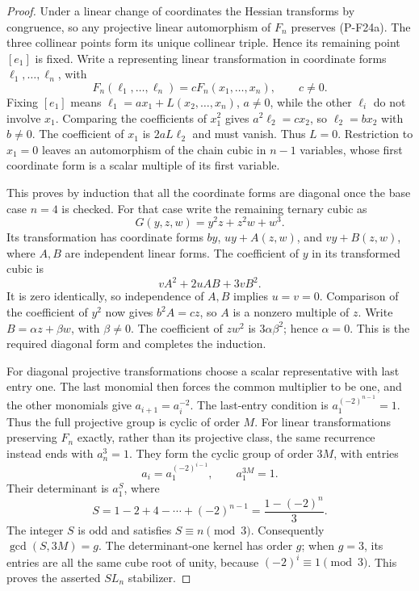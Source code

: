\documentclass[11pt,a4paper]{article}
\begin{document}
\begin{proof}
Under a linear change of coordinates the Hessian transforms by
congruence, so any projective linear automorphism of $F_n$
preserves (P-F24a). The three collinear points form its unique
collinear triple. Hence its remaining point $[e_1]$ is fixed.
Write a representing linear transformation in coordinate forms
$\ell_1,\ldots,\ell_n$, with
\[
 F_n(\ell_1,\ldots,\ell_n)=cF_n(x_1,\ldots,x_n),\qquad c\ne0.
\]
Fixing $[e_1]$ means $\ell_1=ax_1+L(x_2,\ldots,x_n)$,
$a\ne0$, while the other $\ell_i$ do not involve $x_1$.
Comparing the coefficients of $x_1^2$ gives
$a^2\ell_2=cx_2$, so $\ell_2=bx_2$ with $b\ne0$.
The coefficient of $x_1$ is $2aL\ell_2$ and must vanish.
Thus $L=0$. Restriction to $x_1=0$ leaves an automorphism
of the chain cubic in $n-1$ variables, whose first coordinate
form is a scalar multiple of its first variable.

This proves by induction that all the coordinate forms are
diagonal once the base case $n=4$ is checked. For that case
write the remaining ternary cubic as
\[
 G(y,z,w)=y^2z+z^2w+w^3.
\]
Its transformation has coordinate forms $by$, $uy+A(z,w)$,
and $vy+B(z,w)$, where $A,B$ are independent linear forms.
The coefficient of $y$ in its transformed cubic is
\[
 vA^2+2uAB+3vB^2.
\]
It is zero identically, so independence of $A,B$ implies
$u=v=0$. Comparison of the coefficient of $y^2$ now gives
$b^2A=cz$, so $A$ is a nonzero multiple of $z$.
Write $B=\alpha z+\beta w$, with $\beta\ne0$. The
coefficient of $zw^2$ is $3\alpha\beta^2$; hence
$\alpha=0$. This is the required diagonal form and completes
the induction.

For diagonal projective transformations choose a scalar
representative with last entry one. The last monomial then
forces the common multiplier to be one, and the other
monomials give $a_{i+1}=a_i^{-2}$. The last-entry condition is
$a_1^{(-2)^{n-1}}=1$. Thus the full projective group is
cyclic of order $M$. For linear transformations preserving
$F_n$ exactly, rather than its projective class, the same
recurrence instead ends with $a_n^3=1$. They form the
cyclic group of order $3M$, with entries
\[
 a_i=a_1^{(-2)^{i-1}},\qquad a_1^{3M}=1.
\]
Their determinant is $a_1^S$, where
\[
 S=1-2+4-\cdots+(-2)^{n-1}
   =\frac{1-(-2)^n}{3}.
\]
The integer $S$ is odd and satisfies $S\equiv n\pmod3$.
Consequently $\gcd(S,3M)=g$. The determinant-one kernel
has order $g$; when $g=3$, its entries are all the same
cube root of unity, because $(-2)^i\equiv1\pmod3$.
This proves the asserted $SL_n$ stabilizer.


\end{proof}
\end{document}
